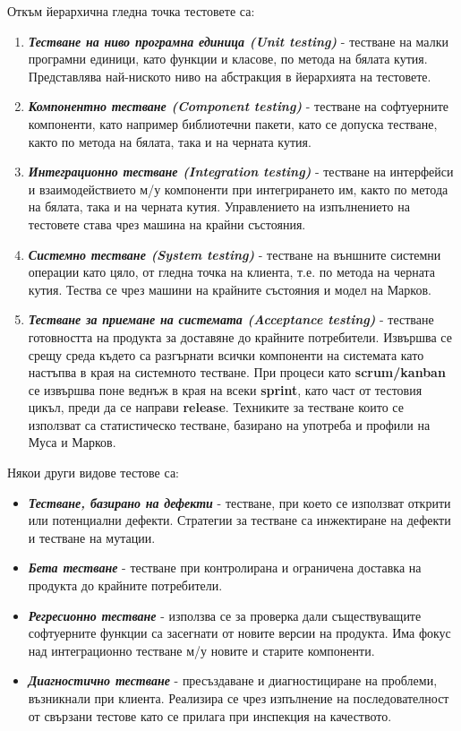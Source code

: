 \documentclass[fleqn,12pt]{article}
\begin{document}
Откъм йерархична гледна точка тестовете са:
\begin{enumerate}
    \item \textbf{\textit{Тестване на ниво програмна единица (Unit testing)}} - тестване на малки програмни единици, като функции и класове, по метода на бялата кутия.
    Представлява най-ниското ниво на абстракция в йерархията на тестовете.
    \item \textbf{\textit{Компонентно тестване (Component testing)}} - тестване на софтуерните компоненти, като например библиотечни пакети, като се допуска тестване, както по метода на бялата, така и на черната кутия.
    \item \textbf{\textit{Интеграционно тестване (Integration testing)}} - тестване на интерфейси и взаимодействието м/у компоненти при интегрирането им, както по метода на бялата, така и на черната кутия.
    Управлението на изпълнението на тестовете става чрез машина на крайни състояния.
    \item \textbf{\textit{Системно тестване (System testing)}} - тестване на външните системни операции като цяло, от гледна точка на клиента, т.е. по метода на черната кутия.
    Тества се чрез машини на крайните състояния и модел на Марков.
    \item \textbf{\textit{Тестване за приемане на системата (Acceptance testing)}} - тестване готовността на продукта за доставяне до крайните потребители.
    Извършва се срещу среда където са разгърнати всички компоненти на системата като настъпва в края на системното тестване.
    При процеси като \textbf{scrum/kanban} се извършва поне веднъж в края на всеки \textbf{sprint}, като част от тестовия цикъл, преди да се направи \textbf{release}.
    Техниките за тестване които се използват са статистическо тестване, базирано на употреба и профили на Муса и Марков.
\end{enumerate}

Някои други видове тестове са:
\begin{itemize}
    \item \textbf{\textit{Тестване, базирано на дефекти}} - тестване, при което се използват открити или потенциални дефекти.
    Стратегии за тестване са инжектиране на дефекти и тестване на мутации.
    \item \textbf{\textit{Бета тестване}} - тестване при контролирана и ограничена доставка на продукта до крайните потребители.
    \item \textbf{\textit{Регресионно тестване}} - използва се за проверка дали съществуващите софтуерните функции са засегнати от новите версии на продукта.
    Има фокус над интеграционно тестване м/у новите и старите компоненти.
    \item \textbf{\textit{Диагностично тестване}} - пресъздаване и диагностициране на проблеми, възникнали при клиента.
    Реализира се чрез изпълнение на последователност от свързани тестове като се прилага при инспекция на качеството.
\end{itemize}
\end{document}
